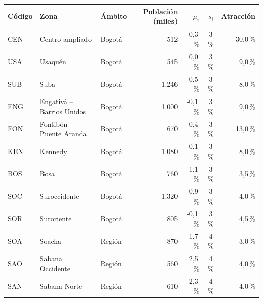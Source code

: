 \begin{tabular}{lllrrrr}
\toprule
Código & Zona & Ámbito & Población (miles) & $\mu_i$ & $s_i$ & Atracción \\
\midrule
CEN & Centro ampliado & Bogotá & 512 & -0,3\,\% & 3\,\% & 30,0\,\% \\
USA & Usaquén & Bogotá & 545 & 0,0\,\% & 3\,\% & 9,0\,\% \\
SUB & Suba & Bogotá & 1.246 & 0,5\,\% & 3\,\% & 8,0\,\% \\
ENG & Engativá – Barrios Unidos & Bogotá & 1.000 & -0,1\,\% & 3\,\% & 9,0\,\% \\
FON & Fontibón – Puente Aranda & Bogotá & 670 & 0,4\,\% & 3\,\% & 13,0\,\% \\
KEN & Kennedy & Bogotá & 1.080 & 0,1\,\% & 3\,\% & 8,0\,\% \\
BOS & Bosa & Bogotá & 760 & 1,1\,\% & 3\,\% & 3,5\,\% \\
SOC & Suroccidente & Bogotá & 1.320 & 0,9\,\% & 3\,\% & 4,0\,\% \\
SOR & Suroriente & Bogotá & 805 & -0,1\,\% & 3\,\% & 4,5\,\% \\
SOA & Soacha & Región & 870 & 1,7\,\% & 4\,\% & 3,0\,\% \\
SAO & Sabana Occidente & Región & 560 & 2,5\,\% & 4\,\% & 4,0\,\% \\
SAN & Sabana Norte & Región & 610 & 2,3\,\% & 4\,\% & 4,0\,\% \\
\bottomrule
\end{tabular}
